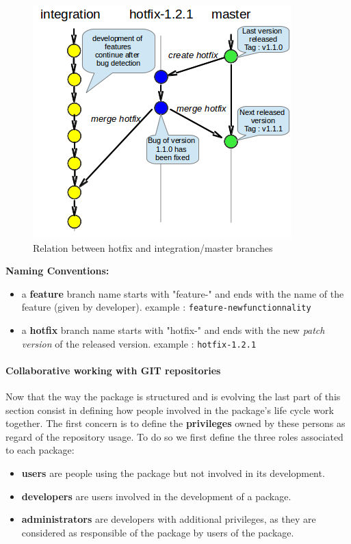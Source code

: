 \documentclass[12pt,a4paper]{article}
\begin{document}
\begin{figure}
\center
\includegraphics[scale=1]{images/hotfix_branching.png}
\caption{Relation between hotfix and integration/master branches}
\label{fig-hotfix-branches}
\end{figure}

\textbf{Naming Conventions:}
\begin{itemize}
\item a \textbf{feature} branch name starts with "feature-" and ends with the name of the feature (given by developer).
\linebreak example : \texttt{feature-newfunctionnality}
\item a \textbf{hotfix} branch name starts with "hotfix-" and ends with the new \textit{patch version} of the released version.
\linebreak example : \texttt{hotfix-1.2.1}
\end{itemize}

\paragraph{Collaborative working with GIT repositories}

Now that the way the package is structured and is evolving the last part of this section consist in defining how people involved in the package's life cycle work together. The first concern is to define the \textbf{privileges} owned by these persons as regard of the repository usage. To do so we first define the three roles associated to each package:
\begin{itemize}
\item \textbf{users} are people using the package but not involved in its development.
\item \textbf{developers} are users involved in the development of a package.
\item \textbf{administrators} are developers with additional privileges, as they are considered as responsible of the package by users of the package.
\end{itemize}
\end{document}
